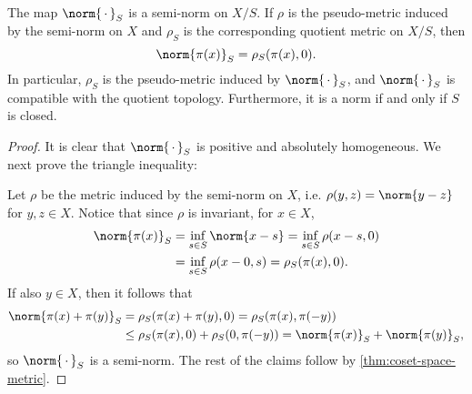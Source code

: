 \documentclass[article, a4paper, 11pt, oneside]{memoir}
\numberwithin{equation}{chapter}
\begin{document}
\begin{proposition}
    The map $\norm{\,\cdot\,}_S$ is a semi-norm on $X/S$. If $\rho$ is the pseudo-metric induced by the semi-norm on $X$ and $\rho_S$ is the corresponding quotient metric on $X/S$, then
    \begin{equation*}
        \norm{\pi(x)}_S = \rho_S(\pi(x), 0).
    \end{equation*}
    In particular, $\rho_S$ is the pseudo-metric induced by $\norm{\,\cdot\,}_S$, and $\norm{\,\cdot\,}_S$ is compatible with the quotient topology. Furthermore, it is a norm if and only if $S$ is closed.
\end{proposition}

\begin{proof}
    It is clear that $\norm{\,\cdot\,}_S$ is positive and absolutely homogeneous. We next prove the triangle inequality:
    
    Let $\rho$ be the metric induced by the semi-norm on $X$, i.e. $\rho(y,z) = \norm{y - z}$ for $y,z \in X$. Notice that since $\rho$ is invariant, for $x \in X$,
    \begin{align*}
        \norm{\pi(x)}_S
            &= \inf_{s \in S} \norm{x - s}
             = \inf_{s \in S} \rho(x - s, 0) \\
            &= \inf_{s \in S} \rho(x - 0, s)
             = \rho_S(\pi(x), 0).
    \end{align*}
    If also $y \in X$, then it follows that
    \begin{align*}
        \norm{\pi(x) + \pi(y)}_S
            &= \rho_S(\pi(x) + \pi(y), 0)
             = \rho_S(\pi(x), \pi(-y)) \\
            &\leq \rho_S(\pi(x), 0) + \rho_S(0, \pi(-y))
             = \norm{\pi(x)}_S + \norm{\pi(y)}_S,
    \end{align*}
    so $\norm{\,\cdot\,}_S$ is a semi-norm. The rest of the claims follow by \cref{thm:coset-space-metric}.
\end{proof}


\nocite{*}

\printbibliography
\end{document}
